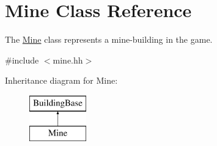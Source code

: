 \hypertarget{classMine}{\section{Mine Class Reference}
\label{classMine}
}


The \hyperlink{classMine}{Mine} class represents a mine-\/building in the game.  




{\ttfamily \#include $<$mine.\-hh$>$}

Inheritance diagram for Mine\-:\begin{figure}[H]
\begin{center}
\leavevmode
\includegraphics[height=2.000000cm]{classMine}
\end{center}
\end{figure}
